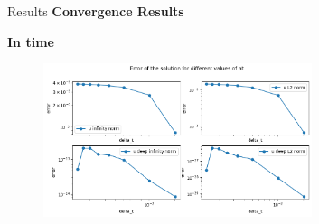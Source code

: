 \begin{frame}{Results}
    \textbf{Convergence Results}
 
    \textbf{In time}
    \begin{figure}
        \centering
        \includegraphics[width=0.7\textwidth]{images/conv3.png}
    \end{figure}
     
 \end{frame}
